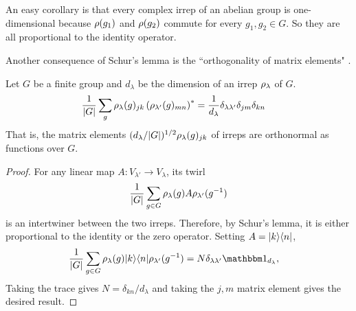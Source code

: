An easy corollary is that every complex irrep of an abelian group is one-di\-men\-sion\-al because $\rho(g_1)$ and $\rho(g_2)$ commute for every $g_1,g_2 \in G$. So they are all proportional to the identity operator.

Another consequence of Schur's lemma is the ``orthogonality of matrix elements" .
\begin{theorem}\label{thm:irrep-orthogonality}
	Let $G$ be a finite group and $d_{\lambda}$ be the dimension of an irrep $\rho_{\lambda}$ of $G$.
	\begin{align}
	\frac{1}{|G|} \sum_g  \rho_{\lambda}(g)_{jk} \left( \rho_{\lambda'}(g)_{mn} \right)^*
	&= \frac{1}{d_{\lambda}} \delta_{\lambda \lambda'} \delta_{jm} \delta_{kn}
	\end{align}
	That is, the matrix elements $(d_{\lambda} / |G|)^{1/2} \rho_{\lambda}(g)_{jk}$ of irreps are orthonormal as functions over $G$.
\end{theorem}
\begin{proof}
	For any linear map $A:V_{\lambda'} \to V_{\lambda}$, its twirl
	\begin{align}
	\frac{1}{|G|} \sum_{g \in G} \rho_{\lambda}(g) A \rho_{\lambda'}(g^{-1})
	\end{align}
	is an intertwiner between the two irreps. Therefore, by Schur's lemma, it is either proportional to the identity or the zero operator. Setting $A = {\left\vert{k}\right\rangle}{\left\langle{n}\right\vert}$,
	\begin{align}
	\frac{1}{|G|} \sum_{g \in G} \rep_{\lambda}(g) \ketbra{k}{n} \rep_{\lambda'}(g^{-1})
	&=  N \delta_{\lambda \lambda'} \id_{d_{\lambda}},
	\end{align}
	Taking the trace gives $N = \delta_{kn}/d_{\lambda}$ and taking the $j,m$ matrix element gives the desired result.
\end{proof}



